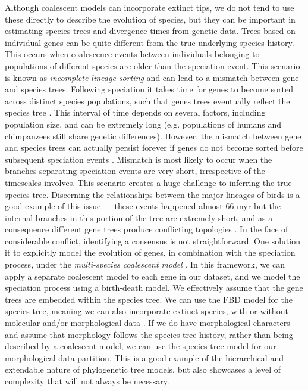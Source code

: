 Although coalescent models can incorporate extinct tips, we do not tend to use these directly to describe the evolution of species, but they can be important in estimating species trees and divergence times from genetic data. %
Trees based on individual genes can be quite different from the true underlying species history. 
This occurs when coalescence events between individuals belonging to populations of different species are older than the speciation event.
This scenario is known as \textit{incomplete lineage sorting} and can lead to a mismatch between gene and species trees.
Following speciation it takes time for genes to become sorted across distinct species populations, such that genes trees  eventually reflect the species tree \citep{Maddison2006}.
This interval of time depends on several factors, including population size, and can be extremely long (e.g. populations of humans and chimpanzees still share genetic differences). 
However, the mismatch between gene and species trees can actually persist forever if genes do not become sorted before subsequent speciation events \citep{Xu2016}. 
Mismatch is most likely to occur when the branches separating speciation events are very short, irrespective of the timescales involves. This scenario creates a huge challenge to inferring the true species tree.
Discerning the relationships between the major lineages of birds is a good example of this issue --- these events happened almost 66 myr but the internal branches in this portion of the tree are extremely short, and as a consequence different gene trees produce conflicting topologies \citep{Jarvis2014}.
In the face of considerable conflict, identifying a consensus is not straightforward. 
One solution it to explicitly model the evolution of genes, in combination with the speciation process, under the \textit{multi-species coalescent model} \citep{Heled2010}.
In this framework, we can apply a separate coalescent model to each gene in our dataset, and we model the speciation process using a birth-death model. 
We effectively assume that the gene trees are embedded within the species tree.
We can use the FBD model for the species tree, meaning we can also incorporate extinct species, with or without molecular and/or morphological data \citep{ogilvie2018}.
If we do have morphological characters and assume that morphology follows the species tree history, rather than being described by a coalescent model, we can use the species tree model for our morphological data partition.
This is a good example of the hierarchical and extendable nature of phylogenetic tree models, but also showcases a level of complexity that will not always be necessary.

